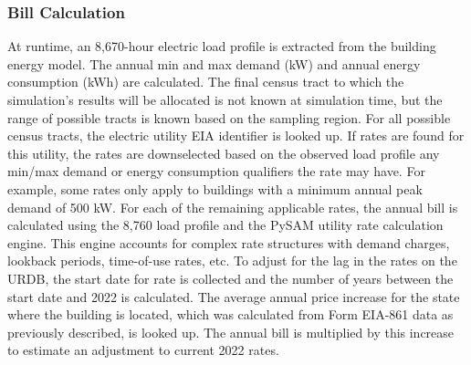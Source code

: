 \subsubsection{Bill Calculation}
At runtime, an 8,670-hour electric load profile is extracted from the building energy model. The annual min and max demand (kW) and annual energy consumption (kWh) are calculated. The final census tract to which the simulation's results will be allocated is not known at simulation time, but the range of possible tracts is known based on the sampling region. For all possible census tracts, the electric utility EIA identifier is looked up. If rates are found for this utility, the rates are downselected based on the observed load profile any min/max demand or energy consumption qualifiers the rate may have. For example, some rates only apply to buildings with a minimum annual peak demand of 500 kW.
For each of the remaining applicable rates, the annual bill is calculated using the 8,760 load profile and the PySAM utility rate calculation engine. This engine accounts for complex rate structures with demand charges, lookback periods, time-of-use rates, etc. To adjust for the lag in the rates on the URDB, the start date for rate is collected and the number of years between the start date and 2022 is calculated. The average annual price increase for the state where the building is located, which was calculated from Form EIA-861 data as previously described, is looked up. The annual bill is multiplied by this increase to estimate an adjustment to current 2022 rates.

